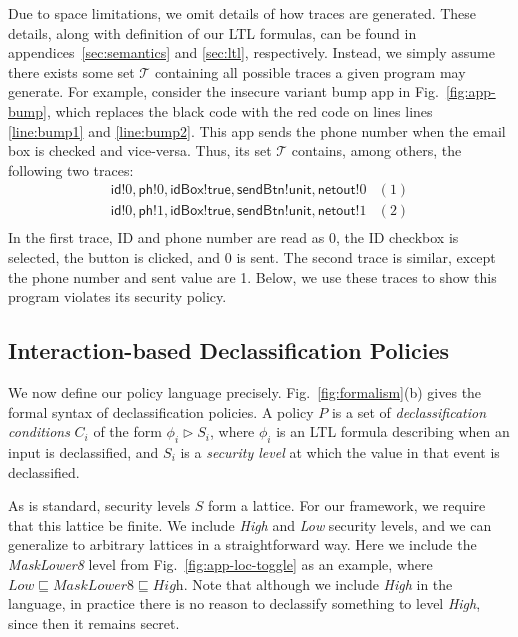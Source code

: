 \documentclass{llncs}
\newcommand{\code}[1]{\textsf{#1}} \newcommand{\bcode}[1]{\texttt{#1}}
\newcommand{\tset}{\ensuremath{\mathcal{T}}\xspace}
\begin{document}
Due to space limitations, we omit details of how traces are
generated.  These details, along with definition of our LTL 
formulas, can be found in appendices~\ref{sec:semantics} and
\ref{sec:ltl}, respectively.
Instead, we simply assume there exists some set
$\tset$ containing all possible traces a given program may
generate.
For example, consider the insecure variant bump app in
Fig.~\ref{fig:app-bump}, which replaces the black code with the red
code on lines lines \ref{line:bump1}
and \ref{line:bump2}.  This app sends the phone number when the
email box is checked and vice-versa. Thus, its set $\tset$
contains, among others, the following two traces:
\begin{displaymath}
  \begin{array}{cl}
    \code{id}!0, \code{ph}!0, \code{idBox}!\code{true},
    \code{sendBtn}!\code{unit}, \code{netout}!0 & (1) \\
    \code{id}!0, \code{ph}!1, \code{idBox}!\code{true},
    \code{sendBtn}!\code{unit}, \code{netout}!1 & (2) \\
  \end{array}
\end{displaymath}\lstset{language=Java}In the first trace, ID and phone number are read as 0, the
ID checkbox is selected, the button is clicked, and 0 is sent.
The second trace is similar, except the phone number and sent value
are 1. Below, we use these traces to show this program
violates its security policy.

\subsection{Interaction-based Declassification Policies}
\label{sec:policies}

We now define our policy language precisely.
Fig.~\ref{fig:formalism}(b) gives the formal syntax of
declassification policies.  A policy $P$ is a set of
\emph{declassification conditions} $C_i$ of the form $\phi_i\rhd S_i$,
where $\phi_i$ is an LTL formula describing when an input is
declassified, and $S_i$ is a \emph{security level} at which the value
in that event is declassified.

As is standard, security levels $S$ form a lattice.  For our
framework, we require that this lattice be finite.  We include
\textit{High} and \textit{Low} security levels, and we can generalize
to arbitrary lattices in a straightforward way. Here we include the
\textit{MaskLower8} level from Fig.~\ref{fig:app-loc-toggle} as an
example, where $\textit{Low} \sqsubseteq \textit{MaskLower8}
\sqsubseteq \textit{High}$.  Note that although we include
\textit{High} in the language, in practice there is no reason to
declassify something to level \textit{High}, since then it remains
secret.
\end{document}
